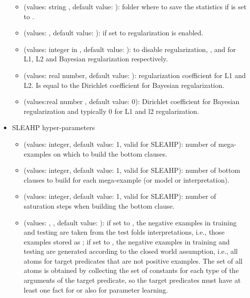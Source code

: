 \documentclass[letterpaper,10pt,english]{sphinxmanual}
\begin{document}
\begin{itemize}
\begin{itemize}
\item {} 
 (values: string , default value: ): folder where to save the statistics if  is set to .

\item {} 
 (values:  , default value: ): if set to  regularization is enabled.

\item {} 
 (values: integer in \sphinxcode{{[}0,3{]}} , default value: ):   to disable regularization, ,  and  for L1, L2 and Bayesian regularization respectively.

\item {} 
 (values: real number, default value: ): regularization coefficient for L1 and L2. Is equal to the Dirichlet coefficient  for Bayesian regularization.

\item {} 
 (values:real number , default value: 0): Dirichlet coefficient  for Bayesian regularization and typically 0 for L1 and l2 regularization.

\end{itemize}

\item {} 
SLEAHP hyper-parameters
\begin{itemize}
\item {} 
 (values: integer, default value: 1, valid for SLEAHP): number of mega-examples on which to build the bottom clauses.

\item {} 
 (values: integer, default value: 1, valid for SLEAHP): number of bottom clauses to build for each mega-example (or model or interpretation).

\item {} 
 (values: integer, default value: 1, valid for SLEAHP): number of saturation steps when building the bottom clause.

\item {} 
 (values: , , default value: ): if set to , the negative examples in training and testing are taken from the test folds interpretations, i.e., those examples  stored as ; if set to , the negative examples in training and testing are generated according to the closed world assumption, i.e., all atoms for target predicates that are not positive examples. The set of all atoms is obtained by collecting the set of constants for each type of the arguments of the target predicate, so the target predicates must have at least one fact for  or  also for parameter learning.


\end{itemize}
\end{itemize}
\end{document}

